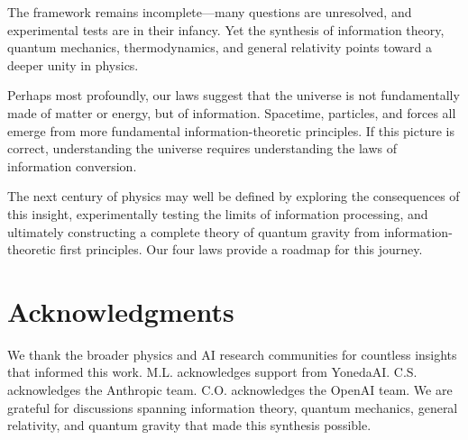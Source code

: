 \documentclass[11pt,a4paper]{article}
\theoremstyle{plain}
\theoremstyle{definition}
\theoremstyle{remark}
\begin{document}
The framework remains incomplete—many questions are unresolved, and experimental tests are in their infancy. Yet the synthesis of information theory, quantum mechanics, thermodynamics, and general relativity points toward a deeper unity in physics.

Perhaps most profoundly, our laws suggest that the universe is not fundamentally made of matter or energy, but of information. Spacetime, particles, and forces all emerge from more fundamental information-theoretic principles. If this picture is correct, understanding the universe requires understanding the laws of information conversion.

The next century of physics may well be defined by exploring the consequences of this insight, experimentally testing the limits of information processing, and ultimately constructing a complete theory of quantum gravity from information-theoretic first principles. Our four laws provide a roadmap for this journey.

\section*{Acknowledgments}

We thank the broader physics and AI research communities for countless insights that informed this work. M.L. acknowledges support from YonedaAI. C.S. acknowledges the Anthropic team. C.O. acknowledges the OpenAI team. We are grateful for discussions spanning information theory, quantum mechanics, general relativity, and quantum gravity that made this synthesis possible.
\end{document}
